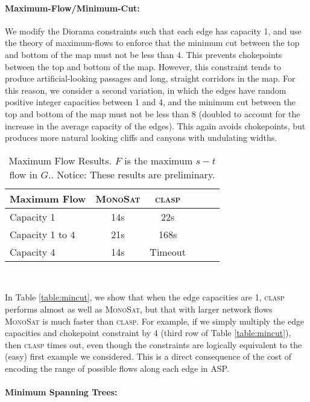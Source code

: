 \documentclass[runningheads]{llncs}
\newcommand{\algformat}[1]{\textsc{#1}\xspace}
\newcommand{\monosat}{\algformat{MonoSat}}
\newcommand{\clasp}{\algformat{clasp}}
\begin{document}
\paragraph{\textbf{Maximum-Flow/Minimum-Cut:}}
We modify the Diorama constraints such that each edge has capacity 1, and use the theory of maximum-flows to enforce that the minimum cut between the top and bottom of the map must not be less than 4. This prevents chokepoints between the top and bottom of the map. However, this constraint tends to produce artificial-looking passages and long, straight corridors in the map. For this reason, we consider a second variation, in which the edges have random positive integer capacities between 1 and 4, and the minimum cut between the top and bottom of the map must not be less than 8 (doubled to account for the increase in the average capacity of the edges). This again avoids chokepoints, but produces more natural looking cliffs and canyons with undulating widths.


\begin{wraptable}{R}{0.45\textwidth}

\begin{tabular}{ l c c c c c }
  Maximum Flow & \monosat &  \clasp  \\
  \hline
Capacity 1 & 14s & 22s  \\
   Capacity 1 to 4 &  21s   &  168s \\
   Capacity 4 & 14s &   Timeout \\
  \hline  
\end{tabular}~~~~
\caption{Maximum Flow Results. $F$ is the maximum $s-t$ flow in $G$.\label{table:MST}. Notice: These results are preliminary.}
\end{wraptable}

In Table \ref{table:mincut}, we show that when the edge capacities are 1, \clasp performs almost as well as \monosat, but that with larger network flows \monosat is much faster than \clasp. For example, if we simply multiply the edge capacities and chokepoint constraint by 4 (third row of Table \ref{table:mincut}), then \clasp times out, even though the constraints are logically equivalent to the (easy) first example we considered. This is a direct consequence of the cost of encoding the range of possible flows along each edge in ASP.



\paragraph{\textbf{Minimum Spanning Trees:}}
\end{document}
